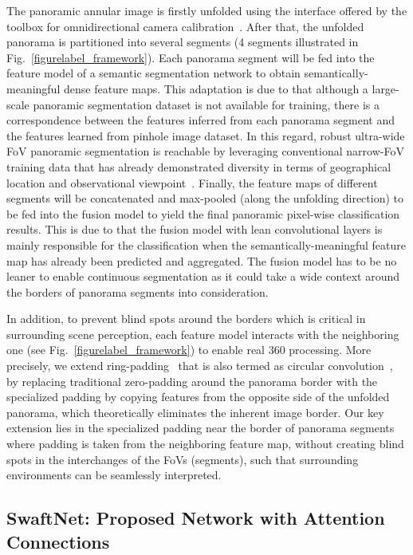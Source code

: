 \documentclass[letterpaper, 10 pt, conference]{ieeeconf}
\begin{document}
The panoramic annular image is firstly unfolded using the interface offered by the toolbox for omnidirectional camera calibration~\cite{scaramuzza2006toolbox}. After that, the unfolded panorama is partitioned into several segments (4 segments illustrated in Fig.~\ref{figurelabel_framework}). Each panorama segment will be fed into the feature model of a semantic segmentation network to obtain semantically-meaningful dense feature maps.
This adaptation is due to that although a large-scale panoramic segmentation dataset is not available for training, there is a correspondence between the features inferred from each panorama segment and the features learned from pinhole image dataset. In this regard, robust ultra-wide FoV panoramic segmentation is reachable by leveraging conventional narrow-FoV training data that has already demonstrated diversity in terms of geographical location and observational viewpoint~\cite{neuhold2017mapillary}. Finally, the feature maps of different segments will be concatenated and max-pooled (along the unfolding direction) to be fed into the fusion model to yield the final panoramic pixel-wise classification results. This is due to that the fusion model with lean convolutional layers is mainly responsible for the classification when the semantically-meaningful feature map has already been predicted and aggregated. The fusion model has to be no leaner to enable continuous segmentation as it could take a wide context around the borders of panorama segments into consideration.

In addition, to prevent blind spots around the borders which is critical in surrounding scene perception, each feature model interacts with the neighboring one (see Fig.~\ref{figurelabel_framework}) to enable real 360 processing. More precisely, we extend ring-padding~\cite{payen2018eliminating} that is also termed as circular convolution~\cite{schubert2019circular}, by replacing traditional zero-padding around the panorama border with the specialized padding by copying features from the opposite side of the unfolded panorama, which theoretically eliminates the inherent image border. Our key extension lies in the specialized padding near the border of panorama segments where padding is taken from the neighboring feature map, without creating blind spots in the interchanges of the FoVs (segments), such that surrounding environments can be seamlessly interpreted.

\subsection{SwaftNet: Proposed Network with Attention Connections}
\end{document}
